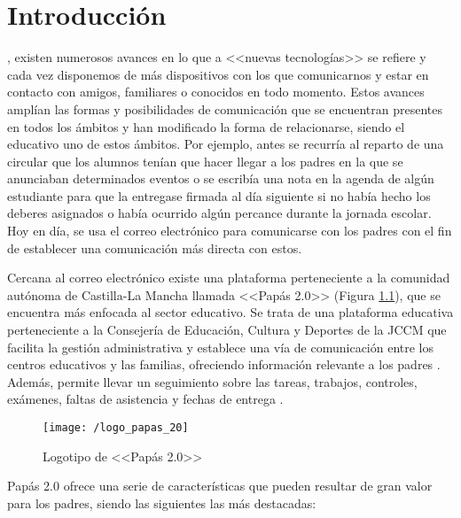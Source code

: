 \chapter{Introducción}
\label{chap:intro}

, existen numerosos avances en lo que a <<nuevas tecnologías>> se refiere y cada vez disponemos de más dispositivos con los que comunicarnos y estar en contacto con amigos, familiares o conocidos en todo momento. Estos avances amplían las formas y posibilidades de comunicación que se encuentran presentes en todos los ámbitos y han modificado la forma de relacionarse, siendo el educativo uno de estos ámbitos. Por ejemplo, antes se recurría al reparto de una circular que los alumnos tenían que hacer llegar a los padres en la que se anunciaban determinados eventos o se escribía una nota en la agenda de algún estudiante para que la entregase firmada al día siguiente si no había hecho los deberes asignados o había ocurrido algún percance durante la jornada escolar. Hoy en día, se usa el correo electrónico para comunicarse con los padres con el fin de establecer una comunicación más directa con estos.

Cercana al correo electrónico existe una plataforma perteneciente a la comunidad autónoma de Castilla-La Mancha llamada <<Papás 2.0>> (Figura \ref{fig:papas20}), que se encuentra más enfocada al sector educativo. Se trata de una plataforma educativa perteneciente a la Consejería de Educación, Cultura y Deportes de la \acf{JCCM} que facilita la gestión administrativa y establece una vía de comunicación entre los centros educativos y las familias, ofreciendo información relevante a los padres \cite{JCCM2017}. Además, permite llevar un seguimiento sobre las tareas, trabajos, controles, exámenes, faltas de asistencia y fechas de entrega \cite{JCCM2010}.

\begin{figure}[!h]
	\begin{center}
		\texttt{[image: /logo\_papas\_20]}
		\caption{Logotipo de <<Papás 2.0>>}
		\label{fig:papas20}
	\end{center}
\end{figure}

\newpage

Papás 2.0 ofrece una serie de características que pueden resultar de gran valor para los padres, siendo las siguientes las más destacadas:

